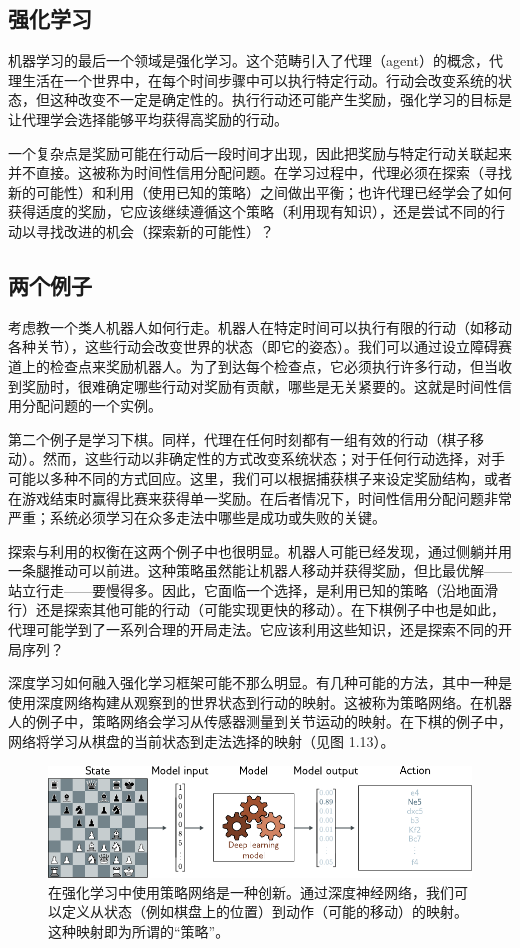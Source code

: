 \documentclass[lang=cn,newtx,10pt,scheme=chinese]{elegantbook}
\begin{document}
\subsection{强化学习}
机器学习的最后一个领域是强化学习。这个范畴引入了代理（agent）的概念，代理生活在一个世界中，在每个时间步骤中可以执行特定行动。行动会改变系统的状态，但这种改变不一定是确定性的。执行行动还可能产生奖励，强化学习的目标是让代理学会选择能够平均获得高奖励的行动。

一个复杂点是奖励可能在行动后一段时间才出现，因此把奖励与特定行动关联起来并不直接。这被称为时间性信用分配问题。在学习过程中，代理必须在探索（寻找新的可能性）和利用（使用已知的策略）之间做出平衡；也许代理已经学会了如何获得适度的奖励，它应该继续遵循这个策略（利用现有知识），还是尝试不同的行动以寻找改进的机会（探索新的可能性）？
\subsection{两个例子}
考虑教一个类人机器人如何行走。机器人在特定时间可以执行有限的行动（如移动各种关节），这些行动会改变世界的状态（即它的姿态）。我们可以通过设立障碍赛道上的检查点来奖励机器人。为了到达每个检查点，它必须执行许多行动，但当收到奖励时，很难确定哪些行动对奖励有贡献，哪些是无关紧要的。这就是时间性信用分配问题的一个实例。

第二个例子是学习下棋。同样，代理在任何时刻都有一组有效的行动（棋子移动）。然而，这些行动以非确定性的方式改变系统状态；对于任何行动选择，对手可能以多种不同的方式回应。这里，我们可以根据捕获棋子来设定奖励结构，或者在游戏结束时赢得比赛来获得单一奖励。在后者情况下，时间性信用分配问题非常严重；系统必须学习在众多走法中哪些是成功或失败的关键。

探索与利用的权衡在这两个例子中也很明显。机器人可能已经发现，通过侧躺并用一条腿推动可以前进。这种策略虽然能让机器人移动并获得奖励，但比最优解——站立行走——要慢得多。因此，它面临一个选择，是利用已知的策略（沿地面滑行）还是探索其他可能的行动（可能实现更快的移动）。在下棋例子中也是如此，代理可能学到了一系列合理的开局走法。它应该利用这些知识，还是探索不同的开局序列？

深度学习如何融入强化学习框架可能不那么明显。有几种可能的方法，其中一种是使用深度网络构建从观察到的世界状态到行动的映射。这被称为策略网络。在机器人的例子中，策略网络会学习从传感器测量到关节运动的映射。在下棋的例子中，网络将学习从棋盘的当前状态到走法选择的映射（见图 1.13）。

\begin{figure}
	\centering
	\includegraphics[width=0.7\linewidth]{PDFFigures/UDLChap1PDF/IntroReinforce.pdf}
	\caption{在强化学习中使用策略网络是一种创新。通过深度神经网络，我们可以定义从状态（例如棋盘上的位置）到动作（可能的移动）的映射。这种映射即为所谓的“策略”。}
\end{figure}
\end{document}
